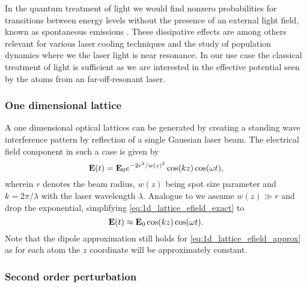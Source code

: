 In the quantum treatment of light we would find nonzero probabilities for
transitions between energy levels without the presence of an external light
field, known as spontaneous emissions \cite{Gerry2004}. These dissipative
effects are among others relevant for various laser cooling techniques and
the study of population dynamics where we the laser light is near resonance.
In our use case the classical treatment of light is sufficient as we are
interested in the effective potential seen by the atoms from an
far-off-resonant laser.

\subsubsection{One dimensional lattice}

A one dimensional optical lattices can be generated by creating a standing
wave interference pattern by reflection of a single Gaussian laser beam. The
electrical field component in such a case is given by
\begin{equation}
  \vb{E}(t)
  =\vb{E}_0e^{-2r^2/w(z)^2}\cos(kz)\cos(\omega t)
  \label{eq:1d_lattice_efield_exact},
\end{equation}
wherein $r$ denotes the beam radius, $w(z)$ being spot size parameter and
$k=2\pi/\lambda$ with the laser wavelength $\lambda$. Analogue to
\cite[p.127]{Rom2009} we assume $w(z)\gg r$ and drop the exponential,
simplifying \cref{eq:1d_lattice_efield_exact} to
\begin{equation}
  \vb{E}(t)
  \approx\vb{E}_0\cos(kz)\cos(\omega t)
  \label{eq:1d_lattice_efield_approx}.
\end{equation}
Note that the dipole approximation still holds for
\cref{eq:1d_lattice_efield_approx} as for each atom the $z$ coordinate
will be approximately constant.

\subsubsection{Second order perturbation}

